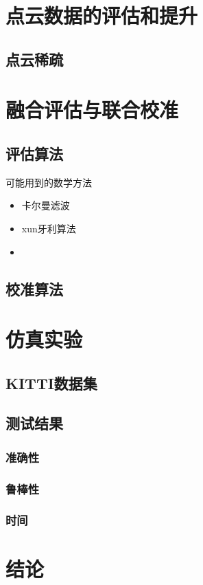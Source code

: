 \documentclass{amsart}
\begin{document}
\section{点云数据的评估和提升}
\subsection{点云稀疏}
\section{融合评估与联合校准}
\subsection{评估算法}
可能用到的数学方法
\begin{itemize}
\item 卡尔曼滤波
\item xun牙利算法
\item 
\end{itemize}
\subsection{校准算法}

\section{仿真实验}
\subsection{KITTI数据集}

\subsection{测试结果}
\subsubsection{准确性}
\label{sec:0601}

\subsubsection{鲁棒性}
\subsubsection{时间}
\section{结论}
\end{document}

